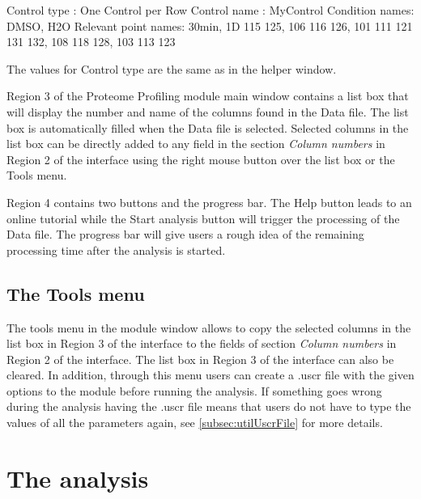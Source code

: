 Control type : One Control per Row\newline
Control name : MyControl\newline
Condition names: DMSO, H2O\newline
Relevant point names: 30min, 1D\newline
{} 115 125, 106 116 126, 101 111 121   131 132, 108 118 128, 103 113 123\newline

The values for Control type are the same as in the helper window.

Region \num{3} of the Proteome Profiling module main window contains a list box that will display the number and name of the columns found in the Data file. The list box is automatically filled when the Data file is selected. Selected columns in the list box can be directly added to any field in the section \textit{Column numbers} in Region \num{2} of the interface using the right mouse button over the list box or the Tools menu.

Region \num{4} contains two buttons and the progress bar. The Help button leads to an online tutorial while the Start analysis button will trigger the processing of the Data file. The progress bar will give users a rough idea of the remaining processing time after the analysis is started.

\subsection{The Tools menu}

The tools menu in the module window allows to copy the selected columns in the list box in Region \num{3} of the interface to the fields of section \textit{Column numbers} in Region \num{2} of the interface. The list box in Region \num{3} of the interface can also be cleared. In addition, through this menu users can create a .uscr file with the given options to the module before running the analysis. If something goes wrong during the analysis having the .uscr file means that users do not have to type the values of all the parameters again, see \autoref{subsec:utilUscrFile} for more details.   

\section{The analysis}
\label{sec:protprofTTest}

